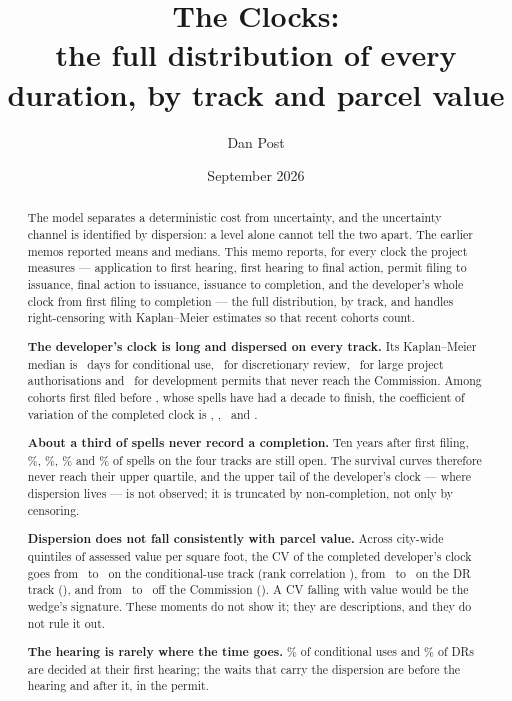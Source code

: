 \documentclass[11pt]{article}
\title{The Clocks:\\
\large the full distribution of every duration, by track and parcel value}
\author{Dan Post}
\date{September 2026}
\begin{document}
\maketitle

\begin{abstract}
\noindent
The model separates a deterministic cost from uncertainty, and the uncertainty channel is
identified by dispersion: a level alone cannot tell the two apart. The earlier memos reported
means and medians. This memo reports, for every clock the project measures --- application to
first hearing, first hearing to final action, permit filing to issuance, final action to
issuance, issuance to completion, and the developer's whole clock from first filing to
completion --- the full distribution, by track, and handles right-censoring with
Kaplan--Meier estimates so that recent cohorts count.

\medskip\noindent
\textbf{The developer's clock is long and dispersed on every track.} Its Kaplan--Meier median
is \ckTotMedCu\ days for conditional use, \ckTotMedDr\ for discretionary review, \ckTotMedLpa\
for large project authorisations and \ckTotMedMin\ for development permits that never reach
the Commission. Among cohorts first filed before \ckMature, whose spells have had a decade to
finish, the coefficient of variation of the completed clock is \ckTotCvCu, \ckTotCvDr,
\ckTotCvLpa\ and \ckTotCvMin.

\medskip\noindent
\textbf{About a third of spells never record a completion.} Ten years after first filing,
\ckTotStenPctCu\%, \ckTotStenPctDr\%, \ckTotStenPctLpa\% and \ckTotStenPctMin\% of spells on the
four tracks are still open. The survival curves therefore never reach their upper quartile,
and the upper tail of the developer's clock --- where dispersion lives --- is not observed; it
is truncated by non-completion, not only by censoring.

\medskip\noindent
\textbf{Dispersion does not fall consistently with parcel value.} Across city-wide quintiles of assessed
value per square foot, the CV of the completed developer's clock goes from \ckCvLoCu\ to
\ckCvHiCu\ on the conditional-use track (rank correlation \ckCvRhoCu), from \ckCvLoDr\ to
\ckCvHiDr\ on the DR track (\ckCvRhoDr), and from \ckCvLoMin\ to \ckCvHiMin\ off the Commission
(\ckCvRhoMin). A CV falling with value would be the wedge's signature. These moments do not
show it; they are descriptions, and they do not rule it out.

\medskip\noindent
\textbf{The hearing is rarely where the time goes.} \ckFirstFinalPctCu\% of conditional uses
and \ckFirstFinalPctDr\% of DRs are decided at their first hearing; the waits that carry the
dispersion are before the hearing and after it, in the permit.
\end{abstract}
\end{document}

